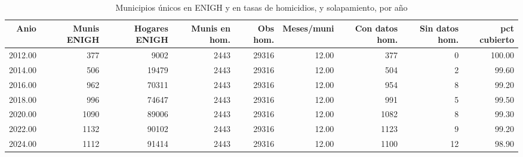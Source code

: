 \begin{table}[ht]
\centering
\caption{Municipios únicos en ENIGH y en tasas de homicidios, y solapamiento, por año} 
\label{tab:muni_M1_universo_por_anio}
\begin{tabular}{rrrrrrrrr}
  \toprule
Anio & Munis ENIGH & Hogares ENIGH & Munis en hom. & Obs hom. & Meses/muni & Con datos hom. & Sin datos hom. & pct cubierto \\ 
  \midrule
2012.00 & 377 & 9002 & 2443 & 29316 & 12.00 & 377 &   0 & 100.00 \\ 
  2014.00 & 506 & 19479 & 2443 & 29316 & 12.00 & 504 &   2 & 99.60 \\ 
  2016.00 & 962 & 70311 & 2443 & 29316 & 12.00 & 954 &   8 & 99.20 \\ 
  2018.00 & 996 & 74647 & 2443 & 29316 & 12.00 & 991 &   5 & 99.50 \\ 
  2020.00 & 1090 & 89006 & 2443 & 29316 & 12.00 & 1082 &   8 & 99.30 \\ 
  2022.00 & 1132 & 90102 & 2443 & 29316 & 12.00 & 1123 &   9 & 99.20 \\ 
  2024.00 & 1112 & 91414 & 2443 & 29316 & 12.00 & 1100 &  12 & 98.90 \\ 
   \bottomrule
\end{tabular}
\end{table}
